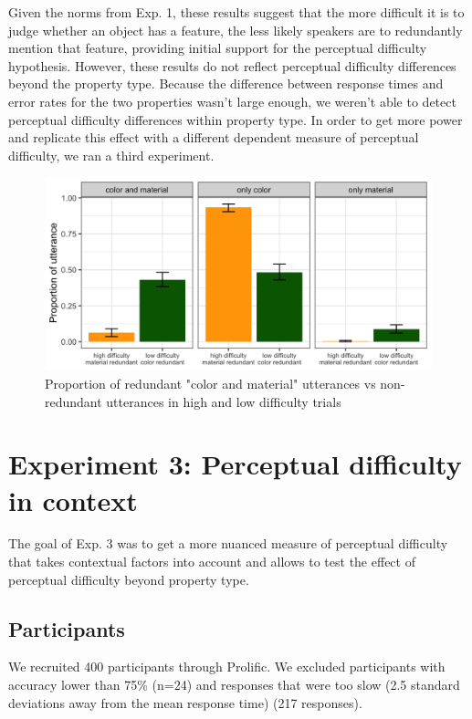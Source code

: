 \documentclass[12pt,letterpaper]{article}
\begin{document}
Given the norms from Exp. 1, these results suggest that the more difficult it is to judge whether an object has a feature, the less likely speakers are to redundantly mention that feature, providing initial support for the perceptual difficulty hypothesis. However, these results do not reflect perceptual difficulty differences beyond the property type. Because the difference between response times and error rates for the two properties wasn't large enough, we weren't able to detect perceptual difficulty differences within property type. In order to get more power and replicate this effect with a different dependent measure of perceptual difficulty, we ran a third experiment.

\begin{figure}[ht]
\centering
\includegraphics[width=.8\textwidth]{plots/exp2_proportion.png}
\caption{Proportion of redundant "color and material" utterances vs non-redundant utterances in high and low difficulty trials}
\label{fig:exp2_proportion}
\end{figure}

\section{Experiment 3: Perceptual difficulty in context} 

The goal of Exp. 3 was to get a more nuanced measure of perceptual difficulty that takes contextual factors into account and allows to test the effect of perceptual difficulty beyond property type.

\subsection{Participants} 

We recruited 400 participants through Prolific. We excluded participants with accuracy lower than 75\% (n=24) and responses that were too slow (2.5 standard deviations away from the mean response time) (217 responses).
\end{document}
